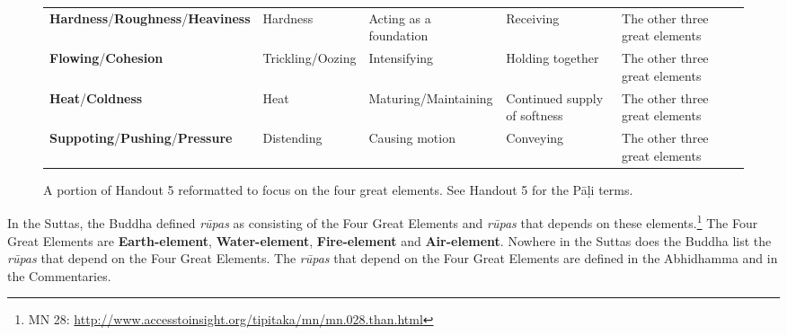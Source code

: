 \begin{figure} [H]

\setlength{\tabcolsep}{0pt}
\renewcommand{\arraystretch}{1.1}

\noindent\begin{tabular}{P{0.25\textwidth} | C{.185\textwidth} C{0.185\textwidth} C{0.185\textwidth} C{0.195\textwidth} m{0mm}}
\toprule
 &  &  &  & \\
\midrule
\textbf{Hardness}/\newline \textbf{Roughness}/\newline \textbf{Heaviness} & Hardness & Acting as a foundation & Receiving & The other three great elements &\\[9mm]
\textbf{Flowing}/\newline \textbf{Cohesion} & Trickling/\newline Oozing & Intensifying & Holding together & The other three great elements &\\[9mm]
\textbf{Heat}/\newline \textbf{Coldness} & Heat & Maturing/\newline Maintaining & Continued supply of softness & The other three great elements &\\[9mm]
\textbf{Suppoting}/\newline \textbf{Pushing}/\newline \textbf{Pressure} & Distending & Causing motion & Conveying & The other three great elements &\\[9mm]
\bottomrule
\end{tabular} 

\caption{A portion of Handout 5 reformatted to focus on the four great elements. See Handout 5 for the Pāḷi terms.}

\end{figure}

In the Suttas, the Buddha defined \textit{rūpas} as consisting of the Four Great Elements and \textit{rūpas} that depends on these elements.\footnote{MN 28: \url{http://www.accesstoinsight.org/tipitaka/mn/mn.028.than.html}} The Four Great Elements are \textbf{Earth-element}, \textbf{Water-element}, \textbf{Fire-element} and \textbf{Air-element}. Nowhere in the Suttas does the Buddha list the \textit{rūpas} that depend on the Four Great Elements. The \textit{rūpas} that depend on the Four Great Elements are defined in the Abhidhamma and in the Commentaries.

